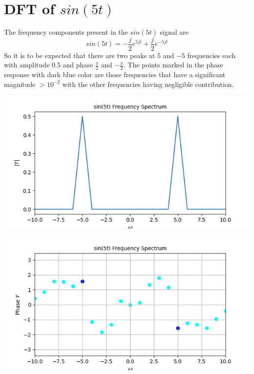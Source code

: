 \documentclass[12pt, a4paper]{report}
\begin{document}
\section*{DFT of $sin(5t)$}
The frequency components present in the $sin(5t)$ signal are
\begin{equation*}
sin(5t) = -\frac{j}{2}e^{5jt} + \frac{j}{2}e^{-5jt}
\end{equation*}
So it is to be expected that there are two peaks at $5$ and $-5$ frequencies each with amplitude 0.5 and phase $\frac{\pi}{2}$ and $-\frac{\pi}{2}$. The points marked in the phase response with dark blue color are those frequencies that have a significant magnitude $> 10^{-2}$ with the other frequencies having negligible contribution. 
\clearpage
\begin{center}
	\includegraphics[scale=0.85]{Figure_1.png} 
	\label{fig:rawdata}
\end{center}

\begin{center}
	\includegraphics[scale=0.85]{Figure_2.png} 
	\label{fig:rawdata}
\end{center}
\end{document}

